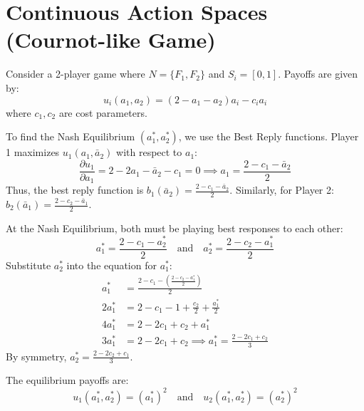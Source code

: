 \documentclass[12pt, a4paper]{article}
\begin{document}
\section{Continuous Action Spaces (Cournot-like Game)}

Consider a 2-player game where $N = \{F_1, F_2\}$ and $S_i = [0, 1]$.
Payoffs are given by:
\[
  u_i(a_1, a_2) = (2 - a_1 - a_2)a_i - c_i a_i
\]
where $c_1, c_2$ are cost parameters.

To find the Nash Equilibrium $(a_1^*, a_2^*)$, we use the Best Reply functions.
Player 1 maximizes $u_1(a_1, \bar{a}_2)$ with respect to $a_1$:
\[
  \frac{\partial u_1}{\partial a_1} = 2 - 2a_1 - \bar{a}_2 - c_1 = 0 \implies a_1 = \frac{2 - c_1 - \bar{a}_2}{2}
\]
Thus, the best reply function is $b_1(\bar{a}_2) = \frac{2 - c_1 - \bar{a}_2}{2}$.
Similarly, for Player 2: $b_2(\bar{a}_1) = \frac{2 - c_2 - \bar{a}_1}{2}$.

At the Nash Equilibrium, both must be playing best responses to each other:
\[
  a_1^* = \frac{2 - c_1 - a_2^*}{2} \quad \text{and} \quad a_2^* = \frac{2 - c_2 - a_1^*}{2}
\]
Substitute $a_2^*$ into the equation for $a_1^*$:
\begin{align*}
  a_1^* &= \frac{2 - c_1 - \left( \frac{2 - c_2 - a_1^*}{2} \right)}{2} \\
  2a_1^* &= 2 - c_1 - 1 + \frac{c_2}{2} + \frac{a_1^*}{2} \\
  4a_1^* &= 2 - 2c_1 + c_2 + a_1^* \\
  3a_1^* &= 2 - 2c_1 + c_2 \implies a_1^* = \frac{2 - 2c_1 + c_2}{3}
\end{align*}
By symmetry, $a_2^* = \frac{2 - 2c_2 + c_1}{3}$.

The equilibrium payoffs are:
\[
  u_1(a_1^*, a_2^*) = (a_1^*)^2 \quad \text{and} \quad u_2(a_1^*, a_2^*) = (a_2^*)^2
\]
\end{document}

